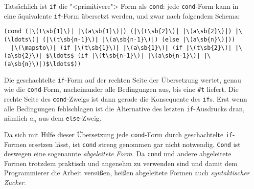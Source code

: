Tatsächlich ist \lstinline{if} die "<primitivere"> Form als
\lstinline{cond}: jede \lstinline{cond}-Form kann in eine äquivalente
\lstinline{if}-Form übersetzt werden, und zwar nach
folgendem Schema:
%
\begin{lstlisting}
(cond (|\(t\sb{1}\)| |\(a\sb{1}\)|) (|\(t\sb{2}\)| |\(a\sb{2}\)|) |\(\ldots\)| (|\(t\sb{n-1}\)| |\(a\sb{n-1}\)|) (else |\(a\sb{n}\)|))
  |\(\mapsto\)| (if |\(t\sb{1}\)| |\(a\sb{1}\)| (if |\(t\sb{2}\)| |\(a\sb{2}\)| $\ldots$ (if |\(t\sb{n-1}\)| |\(a\sb{n-1}\)| |\(a\sb{n}\)|)$\ldots$))
\end{lstlisting}
%
Die geschachtelte \lstinline{if}-Form auf der rechten Seite der
Übersetzung wertet, genau wie die \lstinline{cond}-Form, nacheinander
alle Bedingungen aus, bis eine \lstinline{#t} liefert.  Die rechte Seite des
\lstinline{cond}-Zweigs ist dann gerade die Konsequente des \lstinline{if}s.
Erst wenn alle Bedingungen fehlschlagen ist die Alternative des letzten
\lstinline{if}-Ausdrucks dran, nämlich $a_n$ aus dem \lstinline{else}-Zweig.

Da sich mit Hilfe dieser Übersetzung jede \lstinline{cond}-Form durch
geschachtelte \lstinline{if}-Formen ersetzen lässt, ist \lstinline{cond}
streng genommen gar nicht notwendig.  \lstinline{Cond} ist deswegen eine
sogenannte \textit{abgeleitete Form}.  Da \lstinline{cond} und andere
abgeleitete Formen trotzdem praktisch und angenehm zu verwenden sind
und damit dem Programmierer die Arbeit versüßen,
heißen abgeleitete Formen auch \textit{syntaktischer
  Zucker}.

